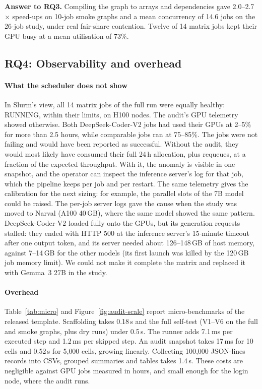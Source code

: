 \documentclass[pdflatex,sn-mathphys-num]{sn-jnl}
\theoremstyle{thmstyleone}%
\theoremstyle{thmstyletwo}%
\theoremstyle{thmstylethree}%
\newcommand{\V}[1]{\textsf{V#1}}
\begin{document}
\begin{tcolorbox}[enhanced, colback=modelbg, colframe=modelbar, boxrule=0.5pt, arc=1pt, left=6pt, right=6pt, top=3pt, bottom=3pt]
\small\textbf{Answer to RQ3.} Compiling the graph to arrays and dependencies
gave 2.0--2.7$\times$ speed-ups on 10-job smoke graphs and a mean concurrency
of 14.6 jobs on the 26-job study, under real fair-share contention. Twelve of 14
matrix jobs kept their GPU busy at a mean utilisation of 73\%.
\end{tcolorbox}

\subsection{RQ4: Observability and overhead}\label{sec:res-rq4}

\paragraph{What the scheduler does not show} In Slurm's view, all 14 matrix
jobs of the full run were equally healthy: RUNNING, within their limits, on
H100 nodes. The audit's GPU telemetry showed otherwise. Both DeepSeek-Coder-V2
jobs had used their GPUs at 2--5\% for more than 2.5 hours, while comparable
jobs ran at 75--85\%. The jobs were not failing and would have been reported
as successful. Without the audit, they would most likely have consumed their
full 24\,h allocation, plus requeues, at a fraction of the expected
throughput. With it, the anomaly is visible in one snapshot, and the
operator can inspect the inference server's log for that job, which the
pipeline keeps per job and per restart. The same telemetry gives the
calibration for the next sizing: for example, the parallel slots of the 7B
model could be raised.
The per-job server logs gave the cause when the study was moved to Narval
(A100 40\,GB), where the same model showed the same pattern. DeepSeek-Coder-V2
loaded fully onto the GPUs, but its generation requests stalled: they ended
with HTTP 500 at the inference server's 15-minute timeout after one output
token, and its server needed about 126--148\,GB of host memory, against
7--14\,GB for the other models (its first launch was killed by the 120\,GB
job memory limit). We could not make it complete the matrix and replaced it
with Gemma~3 27B in the study.

\paragraph{Overhead} Table~\ref{tab:micro} and Figure~\ref{fig:audit-scale}
report micro-benchmarks of the released template. Scaffolding takes 0.18\,s
and the full self-test (\V{1}--\V{6} on the full and smoke graphs, plus dry
runs) under 0.5\,s. The runner adds 7.1\,ms per executed step and 1.2\,ms per
skipped step. An audit snapshot takes 17\,ms for 10 cells and 0.52\,s for
5{,}000 cells, growing linearly. Collecting 100{,}000 JSON-lines records into
CSVs, grouped summaries and tables takes 1.4\,s. These costs are negligible
against GPU jobs measured in hours, and small enough for the login node, where
the audit runs.
\end{document}
